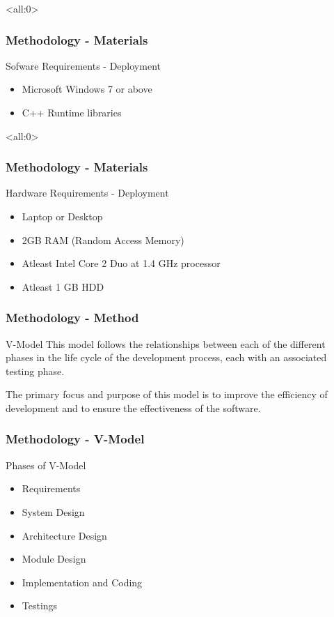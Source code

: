 \documentclass[handout]{beamer}
\begin{document}
\begin{frame}<all:0>
	\frametitle{Methodology - Materials}
	\begin{block}{Sofware Requirements - Deployment}
		\begin{itemize}
			\item<1-> Microsoft Windows 7 or above
			\item<2-> C++ Runtime libraries
		\end{itemize}
	\end{block}
\end{frame}

\begin{frame}<all:0>
	\frametitle{Methodology - Materials}
	\begin{block}{Hardware Requirements - Deployment}
		\begin{itemize}
			\item<1-> Laptop or Desktop
			\item<2-> 2GB RAM (Random Access Memory)
			\item<3-> Atleast Intel Core 2 Duo at 1.4 GHz processor
			\item<4-> Atleast 1 GB HDD
		\end{itemize}
	\end{block}
\end{frame}

\begin{frame}
	\frametitle{Methodology - Method}

	\begin{block}{V-Model}
		This model follows the relationships between each of the different phases
		in the life cycle of the development process, each with an associated
		testing phase.

		The primary focus and purpose of this model is to improve the efficiency of
		development and to ensure the effectiveness of the software.
	\end{block}
\end{frame}

\begin{frame}
	\frametitle{Methodology - V-Model}
	\begin{block}{Phases of V-Model}
		\begin{itemize}
			\item<1-> Requirements
			\item<2-> System Design
			\item<3-> Architecture Design
			\item<4-> Module Design
			\item<5-> Implementation and Coding
			\item<6-> Testings
		\end{itemize}
	\end{block}
\end{frame}
\end{document}
